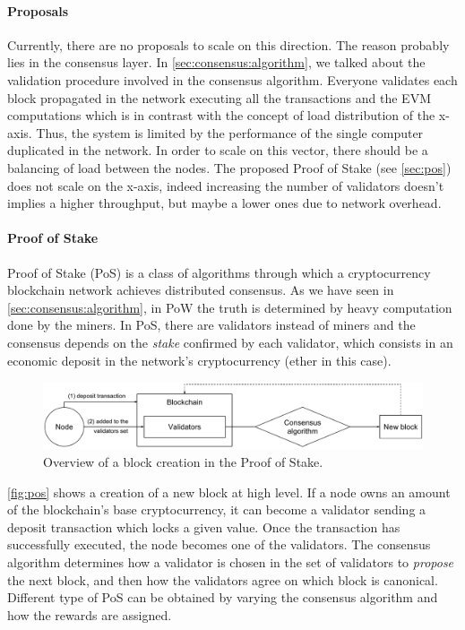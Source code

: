 \paragraph{Proposals}
Currently, there are no proposals to scale on this direction. The reason
probably lies in the consensus layer. In \autoref{sec:consensus:algorithm}, we
talked about the validation procedure involved in the consensus algorithm.
Everyone validates each block propagated in the network executing all the
transactions and the EVM computations which is in contrast with the concept of
load distribution of the x-axis. Thus, the system is limited by the performance
of the single computer duplicated in the network. In order to scale on this
vector, there should be a balancing of load between the nodes. The proposed
Proof of Stake (see \autoref{sec:pos}) does not scale on the
x-axis, indeed increasing the number of validators doesn't implies a higher
throughput, but maybe a lower ones due to network
overhead\cite{bib:cbc-casper}.


\paragraph{Proof of Stake}
\label{sec:pos}
Proof of Stake (PoS) is a class of algorithms through which a cryptocurrency
blockchain network achieves distributed consensus. As we have seen in
\autoref{sec:consensus:algorithm}, in PoW the truth is determined by heavy
computation done by the miners. In PoS, there are validators instead of miners
and the consensus depends on the \emph{stake} confirmed by each validator, which
consists in an economic deposit in the network's cryptocurrency (ether in this
case).

\begin{figure}
	\begin{center}
		\includegraphics[width=\textwidth]{./res/img/pos.pdf}
	\end{center}
	\caption{Overview of a block creation in the Proof of Stake.}
	\label{fig:pos}
\end{figure}

\autoref{fig:pos} shows a creation of a new block at high level. If a node owns
an amount of the blockchain's base cryptocurrency, it can become a validator
sending a deposit transaction which locks a given value. Once the transaction
has successfully executed, the node becomes one of the validators. The consensus
algorithm determines how a validator is chosen in the set of validators to
\emph{propose} the next block, and then how the validators agree on which block
is canonical. Different type of PoS can be obtained by varying the consensus
algorithm and how the rewards are assigned.



